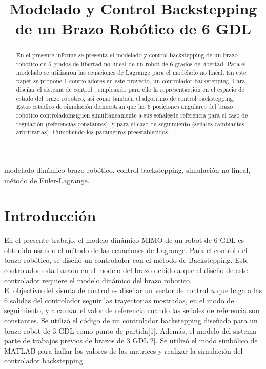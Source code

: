 \documentclass[conference]{IEEEtran}
\begin{document}
\title{Modelado y Control Backstepping de un Brazo Robótico de 6 GDL}

\author{
}

\maketitle
\begin{abstract}
En el presente informe se presenta el modelado y control backstepping de un brazo robotico de 6 grados de libertad no lineal de un robot de 6 grados de libertad. Para el modelado se utilizaron las ecuaciones de Lagrange para el modelado no lineal. En este paper se propone 1 controladores en este proyecto, un controlador backstepping. Para diseñar el sistema de control , empleando para ello la representactión en el espacio de estado del brazo robotico, así como también el algoritmo de control backstepping. Estos estudios de simulación demuestran que las 6 posiciones angulares del brazo robotico controladomsiguen simultáneamente a sus señalesde referencia para el caso de regulación (referencias constantes), y para el caso de seguimiento (señales cambiantes arbritrarias). Cumoliendo los parámetros preestablecidos. 
\end{abstract} 

\begin{IEEEkeywords}
modelado dinámico brazo robótico, control backstepping, simulación no lineal, método de Euler-Lagrange.
\end{IEEEkeywords}

\section{Introducción}
En el presente trabajo, el modelo dinámico MIMO de un robot de 6 GDL es obtenido usando el método de las ecuaciones de Lagrange. Para el control del brazo robótico, se diseñó un controlador con el método de Backstepping. Este controlador esta basado en el modelo del brazo debido a que el diseño de este controlador requiere el modelo dinámico del brazo robotico.\\
El objectivo del sismta de control es diseñar un vector de contrul $u$ que haga a las 6 salidas del controlador seguir las trayectorias mostradas, en el modo de seguimiento, y alcanzar el valor de referencia cuando las señales de referencia son constantes.  Se utilizó el código de un controlador backstepping diseñado para un brazo robot de 3 GDL como punto de partida[1]. Además, el modelo del sistema parte de trabajos previos de brazos de 3 GDL[2]. Se utilizó el modo simbólico de MATLAB para hallar los valores de las matrices y realizar la simulación del controlador backstepping. 
\end{document}

